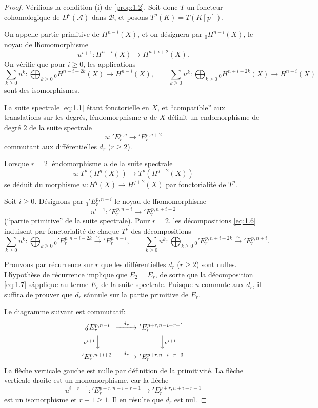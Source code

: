 \documentclass[12pt]{amsart}
\theoremstyle{plain}
\theoremstyle{remark}
\newcommand{\cA}{\mathscr{A}}
\newcommand{\cB}{\mathscr{B}}
\newcommand{\db}{D^b}
\begin{document}
\begin{proof}
V\'erifions la condition (i) de \eqref{prop:1.2}. Soit donc $T$ un foncteur cohomologique de $\db(\cA)$ dans $\cB$, et posons $T^p(K) = T(K[p])$.

On appelle partie primitive de $H^{n-i}(X)$, et on d\'esignera par ${}_0H^{n-i}(X)$, le noyau de l\'homomorphisme
\[
u^{i+1} : H^{n-i}(X) \longrightarrow H^{n+i+2}(X).
\]
On v\'erifie que pour $i \geq 0$, les applications
\begin{equation}\label{eq:1.6}
\sum_{k \geq 0} u^k : \bigoplus_{k \geq 0} {}_0H^{n-i-2k}(X) \longrightarrow H^{n-i}(X),
\qquad
\sum_{k \geq 0} u^k : \bigoplus_{k \geq 0} {}_0H^{n+i-2k}(X) \longrightarrow H^{n+i}(X)
\end{equation}
sont des isomorphismes.

La suite spectrale \eqref{eq:1.1} \'etant fonctorielle en $X$, et ``compatible'' aux translations sur les degr\'es, l\'endomorphisme $u$ de $X$ d\'efinit un endomorphisme de degr\'e $2$ de la suite spectrale
\[
u : {}\!'E_r^{p,q} \longrightarrow {}\!'E_r^{p,q+2}
\]
commutant aux diff\'erentielles $d_r$ ($r \geq 2$).

Lorsque $r = 2$ l\'endomorphisme $u$ de la suite spectrale
\[
u : T^p(H^q(X)) \longrightarrow T^p(H^{q+2}(X))
\]
se d\'eduit du morphisme $u : H^q(X) \to H^{q+2}(X)$ par fonctorialit\'e de $T^p$.

Soit $i \geq 0$. D\'esignons par ${}_0{}\!'E_r^{p,n-i}$ le noyau de l\'homomorphisme
\[
u^{i+1} : {}\!'E_r^{p,n-i} \longrightarrow {}\!'E_r^{p,n+i+2}
\]
(``partie primitive'' de la suite spectrale). Pour $r = 2$, les d\'ecompositions \eqref{eq:1.6} induisent par fonctorialit\'e de chaque $T^p$ des d\'ecompositions
\begin{equation}\label{eq:1.7}
\sum_{k \geq 0} u^k : \bigoplus_{k \geq 0} {}_0{}\!'E_r^{p,n-i-2k} \xrightarrow{\sim} {}\!'E_r^{p,n-i},
\qquad
\sum_{k \geq 0} u^k : \bigoplus_{k \geq 0} {}_0{}\!'E_r^{p,n+i-2k} \xrightarrow{\sim} {}\!'E_r^{p,n+i}.
\end{equation}

Prouvons par r\'ecurrence sur $r$ que les diff\'erentielles $d_r$ ($r \geq 2$) sont nulles. L\'hypoth\`ese de r\'ecurrence implique que $E_2 = E_r$, de sorte que la d\'ecomposition \eqref{eq:1.7} s\'applique au terme $E_r$ de la suite spectrale. Puisque $u$ commute aux $d_r$, il suffira de prouver que $d_r$ s\'annule sur la partie primitive de $E_r$.

Le diagramme suivant est commutatif:
\[
\begin{CD}
{}_0{}\!'E_r^{p,n-i} @>{d_r}>> {}\!'E_r^{p+r,n-i-r+1} \\
@V{\nu^{i+1}}VV @VV{\nu^{i+1}}V \\
{}\!'E_r^{p,n+i+2} @>{d_r}>> {}\!'E_r^{p+r,n-i+r+3}
\end{CD}
\]
La fl\`eche verticale gauche est nulle par d\'efinition de la primitivit\'e. La fl\`eche verticale droite est un monomorphisme, car la fl\`eche
\[
u^{i+r-1} : {}\!'E_r^{p+r,n-i-r+1} \longrightarrow {}\!'E_r^{p+r,n+i+r-1}
\]
est un isomorphisme et $r - 1 \geq 1$. Il en r\'esulte que $d_r$ est nul.
\end{proof}
\end{document}
